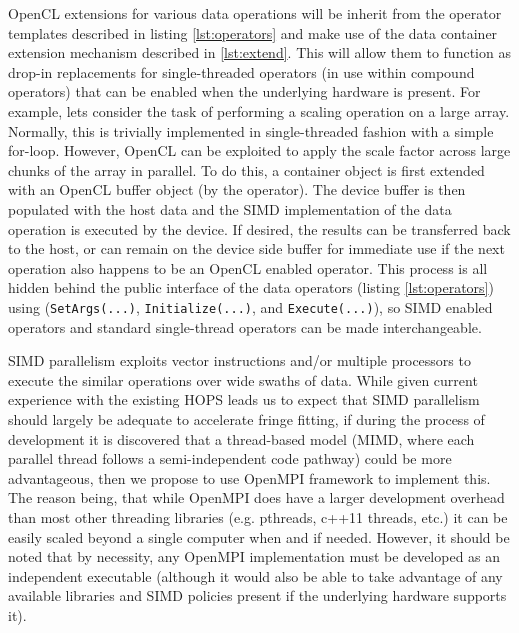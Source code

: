 OpenCL extensions for various data operations will be inherit from the operator templates described in listing \ref{lst:operators} and make use of the data container extension mechanism described in \ref{lst:extend}. This will allow them to function as drop-in replacements for single-threaded operators (in use within compound operators) that can be enabled when the underlying hardware is present. For example, lets consider the task of performing a scaling operation on a large array. Normally, this is trivially implemented in single-threaded fashion with a simple for-loop. However, OpenCL can be exploited to apply the scale factor across large chunks of the array in parallel. To do this, a container object is first extended with an OpenCL buffer object (by the operator). The device buffer is then populated with the host data and the SIMD implementation of the data operation is executed by the device. If desired, the results can be transferred back to the host, or can remain on the device side buffer for immediate use if the next operation also happens to be an OpenCL enabled operator. This process is all hidden behind the public interface of the data operators (listing \ref{lst:operators}) using (\texttt{SetArgs(...)}, \texttt{Initialize(...)}, and \texttt{Execute(...)}), so SIMD enabled operators and standard single-thread operators can be made interchangeable.


SIMD parallelism exploits vector instructions and/or multiple processors to execute the similar operations over wide swaths of data. While given current experience with the existing HOPS leads us to expect that SIMD parallelism should largely be adequate to accelerate fringe fitting, if during the process of development it is discovered that a thread-based model (MIMD, where each parallel thread follows a semi-independent code pathway) could be more advantageous, then we propose to use OpenMPI framework to implement this. The reason being, that while OpenMPI does have a larger development overhead than most other threading libraries (e.g. pthreads, c++11 threads, etc.) it can be easily scaled beyond a single computer when and if needed. However, it should be noted that by necessity, any OpenMPI implementation must be developed as an independent executable (although it would also be able to take advantage of any available libraries and SIMD policies present if the underlying hardware supports it). 
